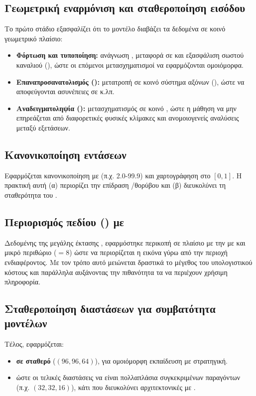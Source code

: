 \subsection{Γεωμετρική εναρμόνιση και σταθεροποίηση εισόδου}
Το πρώτο στάδιο εξασφαλίζει ότι το μοντέλο διαβάζει τα δεδομένα σε κοινό γεωμετρικό πλαίσιο:
\begin{itemize}
  \item \textbf{Φόρτωση και τυποποίηση:} ανάγνωση , μεταφορά σε
         και εξασφάλιση σωστού καναλιού (),
        ώστε οι επόμενοι μετασχηματισμοί να εφαρμόζονται ομοιόμορφα.
  \item \textbf{Επαναπροσανατολισμός ():} μετατροπή σε κοινό
        σύστημα αξόνων (), ώστε να αποφεύγονται ασυνέπειες σε
         κ.λπ.
  \item \textbf{Αναδειγματοληψία ():} μετασχηματισμός σε κοινό
        , ώστε η μάθηση να μην
        επηρεάζεται από διαφορετικές φυσικές κλίμακες και ανομοιογενείς
        αναλύσεις μεταξύ εξετάσεων.
\end{itemize}

\subsection{Κανονικοποίηση εντάσεων}
Εφαρμόζεται κανονικοποίηση με  (π.χ. 2.0-99.9) και
χαρτογράφηση στο $[0,1]$. Η πρακτική αυτή (α) περιορίζει την επίδραση
/θορύβου και (β) διευκολύνει τη σταθερότητα του .

\subsection{Περιορισμός πεδίου () με }
Δεδομένης της μεγάλης έκτασης , εφαρμόστηκε περικοπή σε πλαίσιο με την 
 με  και μικρό περιθώριο ($=8$) ώστε να
περιορίζεται η εικόνα γύρω από την περιοχή ενδιαφέροντος. Με τον τρόπο
αυτό μειώνεται δραστικά το μέγεθος του υπολογιστικού κόστους και παράλληλα αυξάνοντας
την πιθανότητα τα  να περιέχουν χρήσιμη πληροφορία.

\subsection{Σταθεροποίηση διαστάσεων για συμβατότητα μοντέλων}
Τέλος, εφαρμόζεται:
\begin{itemize}
  \item \textbf{ σε σταθερό } ($(96,96,64)$), για
        ομοιόμορφη εκπαίδευση με  στρατηγική.  
        \item \textbf{} ώστε οι τελικές διαστάσεις να είναι
        πολλαπλάσια συγκεκριμένων παραγόντων (π.χ. $(32,32,16)$), κάτι που
        διευκολύνει αρχιτεκτονικές με .
\end{itemize}

